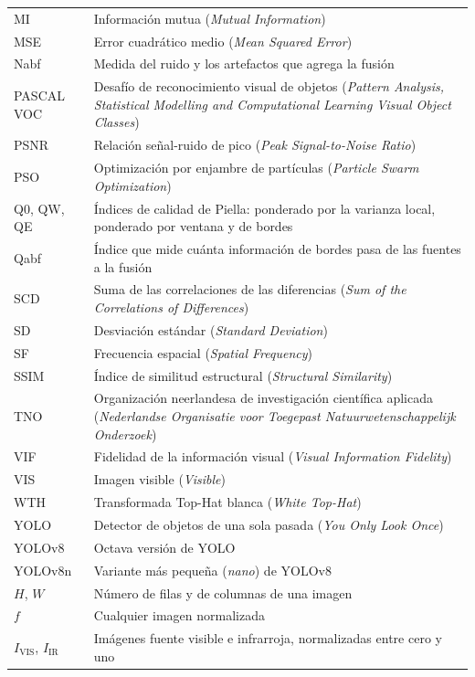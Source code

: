 {\begin{longtable}{@{}>{\raggedleft\arraybackslash}p{}p{}@{}}
MI     & Información mutua (\textit{Mutual Information}) \\
MSE    & Error cuadrático medio (\textit{Mean Squared Error}) \\
Nabf   & Medida del ruido y los artefactos que agrega la fusión \\
PASCAL VOC & Desafío de reconocimiento visual de objetos (\textit{Pattern Analysis, Statistical Modelling and Computational Learning Visual Object Classes}) \\
PSNR   & Relación señal-ruido de pico (\textit{Peak Signal-to-Noise Ratio}) \\
PSO    & Optimización por enjambre de partículas (\textit{Particle Swarm Optimization}) \\
Q0, QW, QE & Índices de calidad de Piella: ponderado por la varianza local, ponderado por ventana y de bordes \\
Qabf   & Índice que mide cuánta información de bordes pasa de las fuentes a la fusión \\
SCD    & Suma de las correlaciones de las diferencias (\textit{Sum of the Correlations of Differences}) \\
SD     & Desviación estándar (\textit{Standard Deviation}) \\
SF     & Frecuencia espacial (\textit{Spatial Frequency}) \\
SSIM   & Índice de similitud estructural (\textit{Structural Similarity}) \\
TNO    & Organización neerlandesa de investigación científica aplicada (\textit{Nederlandse Organisatie voor Toegepast Natuurwetenschappelijk Onderzoek}) \\
VIF    & Fidelidad de la información visual (\textit{Visual Information Fidelity}) \\
VIS    & Imagen visible (\textit{Visible}) \\
WTH    & Transformada Top-Hat blanca (\textit{White Top-Hat}) \\
YOLO   & Detector de objetos de una sola pasada (\textit{You Only Look Once}) \\
YOLOv8 & Octava versión de YOLO \\
YOLOv8n & Variante más pequeña (\textit{nano}) de YOLOv8 \\
$H$, $W$ & Número de filas y de columnas de una imagen \\
$f$    & Cualquier imagen normalizada \\
$I_{\mathrm{VIS}}$, $I_{\mathrm{IR}}$ & Imágenes fuente visible e infrarroja, normalizadas entre cero y uno \\

\end{longtable}}
